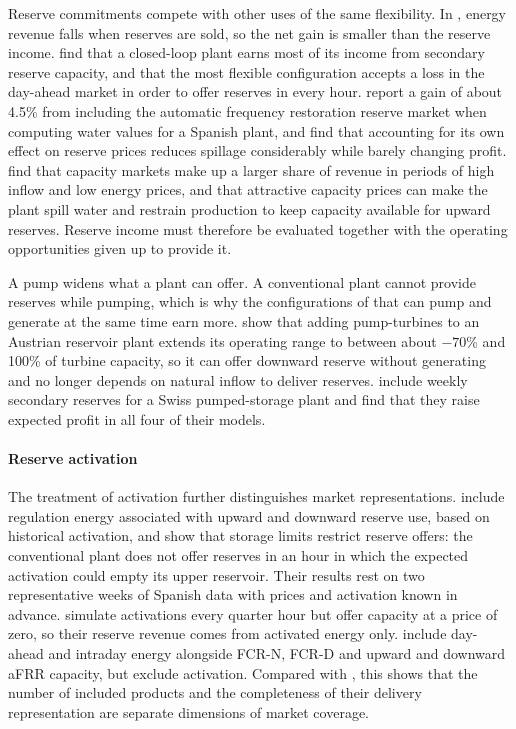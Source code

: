 Reserve commitments compete with other uses of the same flexibility. In
\citet{helseth2017iet}, energy revenue falls when reserves are sold, so
the net gain is smaller than the reserve income. \citet{chazarra2017}
find that a closed-loop plant earns most of its income from secondary
reserve capacity, and that the most flexible configuration accepts a
loss in the day-ahead market in order to offer reserves in every hour.
\citet{perezdiaz2020medium} report a gain of about 4.5\% from including
the automatic frequency restoration reserve market when computing water
values for a Spanish plant, and find that accounting for its own effect
on reserve prices reduces spillage considerably while barely changing
profit. \citet{bore2026assessing} find that capacity markets make up a
larger share of revenue in periods of high inflow and low energy prices,
and that attractive capacity prices can make the plant spill water and
restrain production to keep capacity available for upward reserves.
Reserve income must therefore be evaluated together with the operating
opportunities given up to provide it.

A pump widens what a plant can offer. A conventional plant cannot
provide reserves while pumping, which is why the configurations of
\citet{chazarra2017} that can pump and generate at the same time earn
more. \citet{dallinger2019socioeconomic} show that adding pump-turbines
to an Austrian reservoir plant extends its operating range to between
about $-70$\% and 100\% of turbine capacity, so it can offer downward
reserve without generating and no longer depends on natural inflow to
deliver reserves. \citet{abgottspon2014} include weekly secondary
reserves for a Swiss pumped-storage plant and find that they raise
expected profit in all four of their models.

\paragraph{Reserve activation}
The treatment of activation further distinguishes market
representations. \citet{chazarra2017} include regulation energy
associated with upward and downward reserve use, based on historical
activation, and show that storage limits restrict reserve offers: the
conventional plant does not offer reserves in an hour in which the
expected activation could empty its upper reservoir. Their results rest
on two representative weeks of Spanish data with prices and activation
known in advance. \citet{dallinger2019socioeconomic} simulate
activations every quarter hour but offer capacity at a price of zero, so
their reserve revenue comes from activated energy only.
\citet{bore2026assessing} include day-ahead and intraday energy alongside
FCR-N, FCR-D and upward and downward aFRR capacity, but exclude
activation. Compared with \citet{chazarra2017}, this shows that the
number of included products and the completeness of their delivery
representation are separate dimensions of market coverage.

